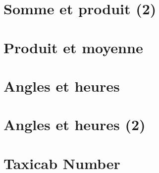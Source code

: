 \section{Somme et produit (2)} 
 

\section{Produit et moyenne} 
 

\section{Angles et heures}\label{1.13} 
 

\section{Angles et heures (2)} 
 

%
%
%
%
%
%

\setcounter{section}{28}
\section{Taxicab Number}\label{1.29}
